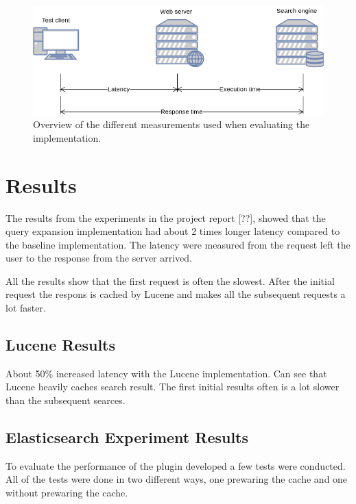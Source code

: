 \begin{figure}[h!]
  \centering \includegraphics[width=0.9\linewidth]{img/latency-measurements.png}
  \caption{Overview of the different measurements used when evaluating the implementation.}
  \label{fig:latency-measurements}
\end{figure}

\section{Results}
\label{sec:results}
The results from the experiments in the project report [??],
showed that the query expansion implementation had about 2 times longer latency compared to the baseline implementation.
The latency were measured from the request left the user to the response from the server arrived.

All the results show that the first request is often the slowest.
After the initial request the respons is cached by Lucene and makes all the subsequent requests a lot faster.

\subsection{Lucene Results}
About 50\% increased latency with the Lucene implementation.
Can see that Lucene heavily caches search result.
The first initial results often is a lot slower than the subsequent searces.

\subsection{Elasticsearch Experiment Results}
To evaluate the performance of the plugin developed a few tests were conducted.
All of the tests were done in two different ways,
one prewaring the cache and one without prewaring the cache.


